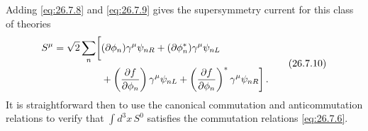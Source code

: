 Adding \eqref{eq:26.7.8} and \eqref{eq:26.7.9} gives the supersymmetry
current for this class of theories
\begin{equation}
  \begin{aligned}
  S^\mu=\sqrt{2}\sum_n\biggl[
    &(\sl{\partial}\phi_n)\gamma^\mu\psi_{nR}
     +(\sl{\partial}\phi_n^*)\gamma^\mu\psi_{nL}
  \\
    &+\left(\frac{\partial f}{\partial\phi_n}\right)
      \gamma^\mu\psi_{nL}
     +\left(\frac{\partial f}{\partial\phi_n}\right)^*
      \gamma^\mu\psi_{nR}
  \biggr]\,.
  \end{aligned}
  \tag{26.7.10}\label{eq:26.7.10}
\end{equation}
It is straightforward then to use the canonical commutation and
anticommutation relations to verify that \(\int d^3x\,S^0\) satisfies the
commutation relations \eqref{eq:26.7.6}.

